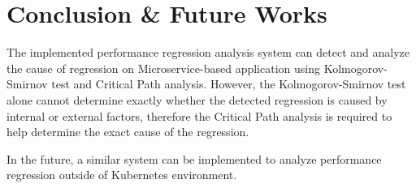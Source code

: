\documentclass[conference]{configs/IEEEtran}
\begin{document}
\section{Conclusion \& Future Works}
The implemented performance regression analysis system can detect and analyze the cause of regression on Microservice-based application using Kolmogorov-Smirnov test and Critical Path analysis. However, the Kolmogorov-Smirnov test alone cannot determine exactly whether the detected regression is caused by internal or external factors, therefore the Critical Path analysis is required to help determine the exact cause of the regression.

In the future, a similar system can be implemented to analyze performance regression outside of Kubernetes environment.

%




\vspace{12pt}
\end{document}
